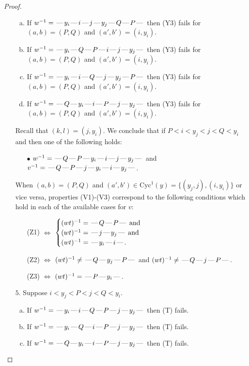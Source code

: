 \documentclass[10pt]{article}
\theoremstyle{definition}
\theoremstyle{definition}
\def\dash{\text{\hspace{0.5mm}---\hspace{0.5mm}}}
\def\Cyc{\mathrm{Cyc}}
\begin{document}
\begin{proof}
\begin{enumerate}
\begin{enumerate}[(a)]
\item If $w^{-1} = \dash y_i\dash i\dash j\dash y_j\dash Q\dash P\dash $ then (Y3) fails for $(a,b)=(P,Q)$ and $(a',b')=(i,y_i)$.
\item If $w^{-1} = \dash y_i\dash Q\dash P\dash i\dash j\dash y_j\dash $ then (Y3) fails for $(a,b)=(P,Q)$ and $(a',b')=(i,y_i)$.
\item If $w^{-1} = \dash y_i\dash i\dash Q\dash j\dash y_j\dash P\dash $ then (Y3) fails for $(a,b)=(P,Q)$ and $(a',b')=(i,y_i)$.
\item If $w^{-1} = \dash Q\dash y_i\dash i\dash P\dash j\dash y_j\dash $ then (Y3) fails for $(a,b)=(P,Q)$ and $(a',b')=(i,y_i)$.
\end{enumerate}
Recall that $(k,l) = (j,y_i)$.
We conclude that if $P < i < y_j < j < Q < y_i$ and then one of the following holds:
\begin{enumerate}
\item[$\bullet$] $w^{-1} = \dash Q\dash P\dash y_i\dash i\dash j\dash y_j\dash $ and $v^{-1} = \dash Q\dash P\dash j\dash y_i\dash i\dash y_j\dash $.
\end{enumerate}
When $(a,b)= (P,Q)$ and $(a',b')\in \Cyc^1(y)=\{(y_j,j),(i,y_i)\}$ or vice versa,
properties (V1)-(V3) correspond to the following conditions which hold in
each of the available cases for $v$:
\begin{enumerate}
\item[](Z1) $\Leftrightarrow$ $\begin{cases}\text{$(wt)^{-1} = \dash Q \dash P \dash$}\text{ and }\\
\text{$(wt)^{-1} = \dash j \dash y_j \dash$}\text{ and }\\
\text{$(wt)^{-1} = \dash y_i \dash i \dash$}.\end{cases}$
\item[](Z2) $\Leftrightarrow$ $(wt)^{-1} \neq \dash Q \dash y_j \dash P \dash$ and $(wt)^{-1}\neq \dash Q \dash j \dash P \dash$.
\item[](Z3) $\Leftrightarrow$ $(wt)^{-1} = \dash P \dash y_i \dash$.
\end{enumerate}
\item[$5$.] Suppose $i < y_j < P < j < Q < y_i$.
\begin{enumerate}[(a)]
\item If $w^{-1} = \dash y_i\dash i\dash Q\dash P\dash j\dash y_j\dash $ then (T) fails.
\item If $w^{-1} = \dash y_i\dash Q\dash i\dash P\dash j\dash y_j\dash $ then (T) fails.
\item If $w^{-1} = \dash Q\dash y_i\dash i\dash P\dash j\dash y_j\dash $ then (T) fails.

\end{enumerate}
\end{enumerate}
\end{proof}
\end{document}

